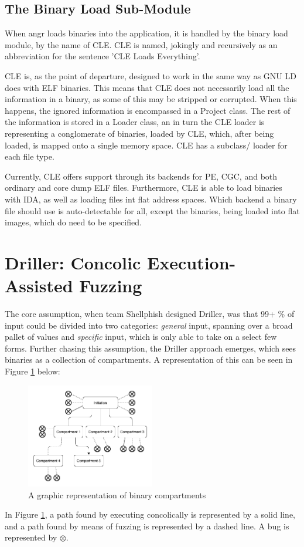 \documentclass[a4paper]{article}
\newcommand{\tit}[1]{\textit{#1}}
\begin{document}
\subsection{The Binary Load Sub-Module}
\label{sec:binaryLoader}
When angr loads binaries into the application, it is handled by the binary load module, by the name of CLE. CLE is named, jokingly and recursively as an abbreviation for the sentence 'CLE Loads Everything'.

CLE is, as the point of departure, designed to work in the same way as GNU LD does with ELF binaries. This means that CLE does not necessarily load all the information in a binary, as some of this may be stripped or corrupted. When this happens, the ignored information is encompassed in a Project class. The rest of the information is stored in a Loader class, an in turn the CLE loader is representing a conglomerate of binaries, loaded by CLE, which, after being loaded, is mapped onto a single memory space. CLE has a subclass/ loader for each file type.

Currently, CLE offers support through its backends for PE, CGC, and both ordinary and core dump ELF files. Furthermore, CLE is able to load binaries with IDA, as well as loading files int flat address spaces. Which backend a binary file should use is auto-detectable for all, except the binaries, being loaded into flat images, which do need to be specified.
\section{Driller: Concolic Execution-Assisted Fuzzing}
\label{sec:Driller}
The core assumption, when team Shellphish designed Driller, was that 99+ \% of input could be divided into two categories: \tit{general} input, spanning over a broad pallet of values and \tit{specific} input, which is only able to take on a select few forms. Further chasing this assumption, the Driller approach emerges, which sees binaries as a collection of compartments. A representation of this can be seen in Figure \ref{Compartments} below:
\begin{figure}[H]
	\centering
	\includegraphics[width=0.5\textwidth]{Compartments}
	\caption{A graphic representation of binary compartments}
	\label{Compartments}
\end{figure}
\noindent
In Figure \ref{Compartments}, a path found by executing concolically is represented by a solid line, and a path found by means of fuzzing is represented by a dashed line. A bug is represented by $\otimes$. 
\end{document}
